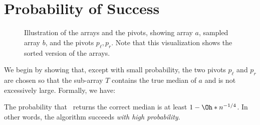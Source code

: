 \section*{Probability of Success}





\begin{figure}[htbp]
    \centering
    \caption{Illustration of the arrays and the pivots, showing array $a$, sampled array $b$, and the pivots $p_\ell, p_r$. Note that this visualization shows the sorted version of the arrays.}
    \label{fig:randmedian}
  \end{figure}
  






We begin by showing that, except with small probability, the two pivots \(p_\ell\) and \(p_r\) are chosen so that the sub-array \(T\) contains the true median of \(a\) and is not excessively large. Formally, we have:

\begin{theorem}
    \label{thm:correctness}
    The probability that~ returns the correct median is at least \(1 - \Oh*{n^{-1/4}}\). In other words, the algorithm succeeds \emph{with high probability}.
    \end{theorem}
    
